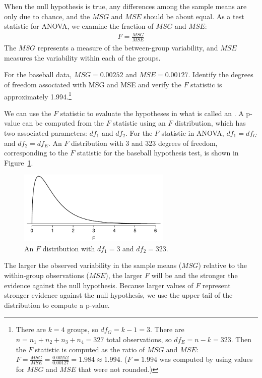 When the null hypothesis is true, any differences among the sample means are only due to chance, and the $MSG$ and $MSE$ should be about equal. As a test statistic for ANOVA, we examine the fraction of $MSG$ and $MSE$:
\begin{align} \label{formulaForTheFStatistic}
F = \frac{MSG}{MSE}
\end{align}
The $MSG$ represents a measure of the between-group variability, and $MSE$ measures the variability within each of the groups.

\begin{exercise}
For the baseball data, $MSG = 0.00252$ and $MSE=0.00127$. Identify the degrees of freedom associated with MSG and MSE and verify the $F$ statistic is approximately 1.994.\footnote{There are $k=4$ groups, so $df_{G} = k-1 = 3$. There are $n = n_1 + n_2 + n_3 + n_4 = 327$ total observations, so $df_{E} = n - k = 323$. Then the $F$ statistic is computed as the ratio of $MSG$ and $MSE$: $F = \frac{MSG}{MSE} = \frac{0.00252}{0.00127} = 1.984 \approx 1.994$. ($F=1.994$ was computed by using values for $MSG$ and $MSE$ that were not rounded.)}
\end{exercise}

We can use the $F$ statistic to evaluate the hypotheses in what is called an . A p-value can be computed from the $F$ statistic using an $F$ distribution, which has two associated parameters: $df_{1}$ and $df_{2}$. For the $F$ statistic in ANOVA, $df_{1} = df_{G}$ and $df_{2}= df_{E}$. An $F$ distribution with 3 and 323 degrees of freedom, corresponding to the $F$ statistic for the baseball hypothesis test, is shown in Figure~\ref{fDist3And323}.

\begin{figure}[ht]
\centering
\includegraphics[width=0.65\textwidth]{ch_inference_for_means/figures/fDist3And323/fDist3And323}
\caption{An $F$ distribution with $df_1=3$ and $df_2=323$.}
\label{fDist3And323}
\end{figure}

The larger the observed variability in the sample means ($MSG$) relative to the within-group observations ($MSE$), the larger $F$ will be and the stronger the evidence against the null hypothesis. Because larger values of $F$ represent stronger evidence against the null hypothesis, we use the upper tail of the distribution to compute a p-value.

